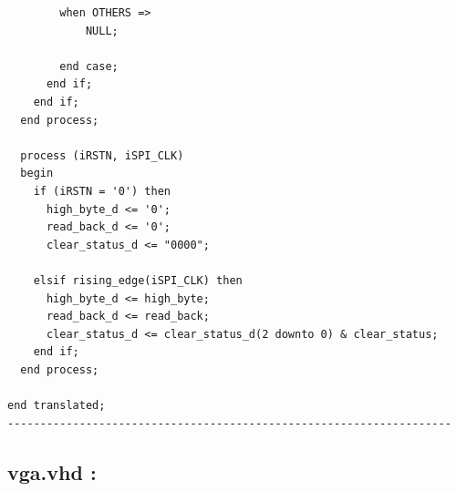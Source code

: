 \documentclass[12pt,a4paper,hyperlinks]{rapport_unif}
\begin{document}
\begin{lstlisting}
        when OTHERS =>
            NULL;
              
        end case;
      end if;
    end if;
  end process;

  process (iRSTN, iSPI_CLK)
  begin
    if (iRSTN = '0') then
      high_byte_d <= '0';    
      read_back_d <= '0';    
      clear_status_d <= "0000";  
		
    elsif rising_edge(iSPI_CLK) then
      high_byte_d <= high_byte;
      read_back_d <= read_back;
      clear_status_d <= clear_status_d(2 downto 0) & clear_status;    
    end if;
  end process;

end translated;
--------------------------------------------------------------------
\end{lstlisting}

\subsection*{vga.vhd :}
\end{document}
